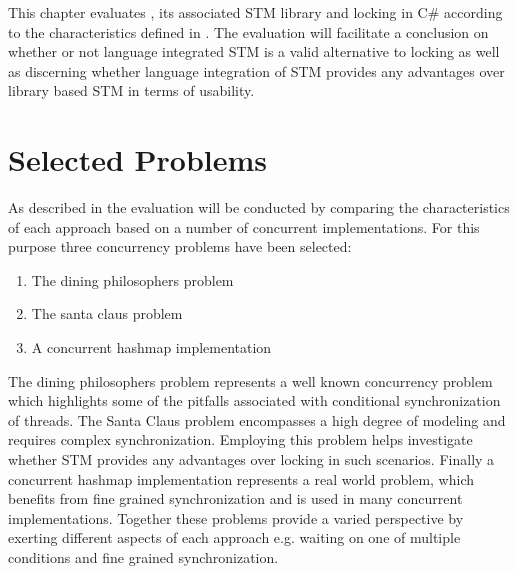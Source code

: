\makeatletter {}\makeatother
{}
This chapter evaluates \stmname, its associated \ac{STM} library and locking in C\# according to the characteristics defined in \cite[p. 15-21]{dpt907e14trending}. The evaluation will facilitate a conclusion on whether or not language integrated \ac{STM} is a valid alternative to locking as well as discerning whether language integration of \ac{STM} provides any advantages over library based \ac{STM} in terms of usability.
\label{chap:evaluation}
\section{Selected Problems}
As described in  the evaluation will be conducted by comparing the characteristics of each approach based on a number of concurrent implementations. For this purpose three concurrency problems have been selected:
\begin{enumerate}
\item The dining philosophers problem\cite[p. 673]{hoare1978communicating}
\item The santa claus problem\cite{trono1994new}
\item A concurrent hashmap implementation\cite[p. 253]{cormen2009introduction}
\end{enumerate}
The dining philosophers problem represents a well known concurrency problem which highlights some of the pitfalls associated with conditional synchronization of threads. The Santa Claus problem encompasses a high degree of modeling and requires complex synchronization. Employing this problem helps investigate whether \ac{STM} provides any advantages over locking in such scenarios. Finally a concurrent hashmap implementation represents a real world problem, which benefits from fine grained synchronization and is used in many concurrent implementations. Together these problems provide a varied perspective by exerting different aspects of each approach e.g. waiting on one of multiple conditions and fine grained synchronization.

